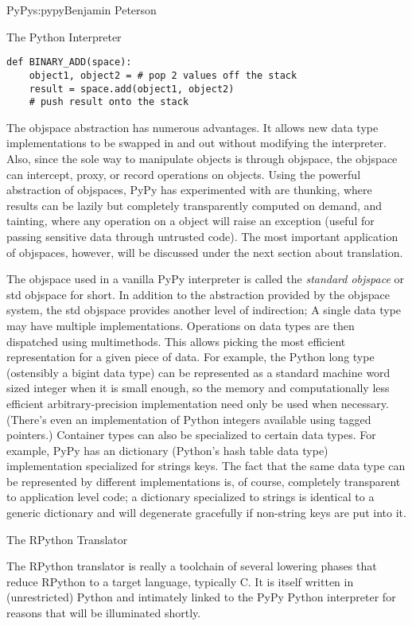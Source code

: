 \begin{aosachapter}{PyPy}{s:pypy}{Benjamin Peterson}
\begin{aosasect1}{The Python Interpreter}
\begin{verbatim}
def BINARY_ADD(space):
    object1, object2 = # pop 2 values off the stack
    result = space.add(object1, object2)
    # push result onto the stack
\end{verbatim}

The objspace abstraction has numerous advantages. It allows new data type
implementations to be swapped in and out without modifying the
interpreter. Also, since the sole way to manipulate objects is through objspace,
the objspace can intercept, proxy, or record operations on objects. Using the
powerful abstraction of objspaces, PyPy has experimented with are thunking,
where results can be lazily but completely transparently computed on demand, and
tainting, where any operation on a object will raise an exception (useful for
passing sensitive data through untrusted code). The most important application
of objspaces, however, will be discussed under the next section about
translation.

The objspace used in a vanilla PyPy interpreter is called the \emph{standard
  objspace} or std objspace for short. In addition to the abstraction provided
by the objspace system, the std objspace provides another level of indirection;
A single data type may have multiple implementations. Operations on data types
are then dispatched using multimethods. This allows picking the most efficient
representation for a given piece of data. For example, the Python long type
(ostensibly a bigint data type) can be represented as a standard machine word
sized integer when it is small enough, so the memory and computationally less
efficient arbitrary-precision implementation need only be used when
necessary. (There's even an implementation of Python integers available using
tagged pointers.) Container types can also be specialized to certain data
types. For example, PyPy has an dictionary (Python's hash table data type)
implementation specialized for strings keys. The fact that the same data type
can be represented by different implementations is, of course, completely
transparent to application level code; a dictionary specialized to strings is
identical to a generic dictionary and will degenerate gracefully if non-string
keys are put into it.

\end{aosasect1}

\begin{aosasect1}{The RPython Translator}
\label{sec:translator}

The RPython translator is really a toolchain of several lowering phases that
reduce RPython to a target language, typically C. It is itself written in
(unrestricted) Python and intimately linked to the PyPy Python interpreter for
reasons that will be illuminated shortly.


\end{aosasect1}
\end{aosachapter}
